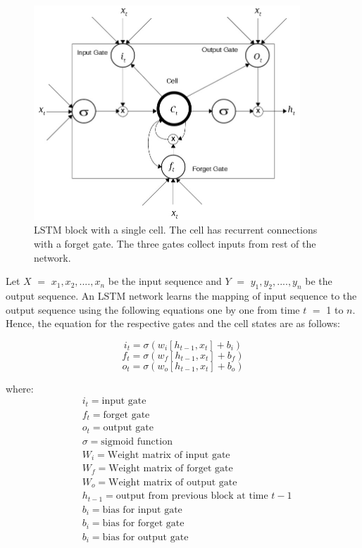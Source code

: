 \begin{figure}[!htbp]
    \centering
    \includegraphics[width=10cm]{pics/lstm.jpg}
    \captionsetup{justification=centering,margin=2cm}
    \caption{LSTM block with a single cell. The cell has recurrent connections with a forget gate. The three gates collect inputs from rest of the network. }
    \label{fig:LSTM_BLOCK}
\end{figure}


Let $X$ $=$ ${x_{1}, x_{2},....,x_{n}}$ be the input sequence and $Y$ $=$ ${y_{1}, y_{2},....,y_{n}}$ be the output sequence. An LSTM network learns the mapping of input sequence to the output sequence using the following equations one by one from time $t$ $=$ 1 to $n$. Hence, the equation for the respective gates and the cell states are as follows:

\begin{equation} \label{eq:lstm_input_gate}
    i_{t} =\sigma(w_{i}[h_{t-1},x_{t}]+b_{i})
\end{equation}
\begin{equation}\label{eq:lstm_forget_gate}
    f_{t} =\sigma(w_{f}[h_{t-1},x_{t}]+b_{f})
\end{equation}
\begin{equation}\label{eq:lstm_output_gate}
    o_{t} = \sigma(w_{o}[h_{t-1},x_{t}]+b_{o})
\end{equation}

where:
\begin{align*}
      & i_{t}=\text{input gate}\\
      & f_{t}=\text{forget gate}\\
      & o_{t}=\text{output gate}\\
      & \sigma=\text{sigmoid function}\\
      & W_{i}=\text{Weight matrix of input gate}\\
      & W_{f}=\text{Weight matrix of forget gate}\\
      & W_{o}=\text{Weight matrix of output gate}\\
      & h_{t-1}=\text{output from previous block at time $t-1$}      \\
      & b_{i}=\text{bias for input gate}    \\
      & b_{i}=\text{bias for forget gate}    \\
      & b_{i}=\text{bias for output gate}\\
\end{align*}

